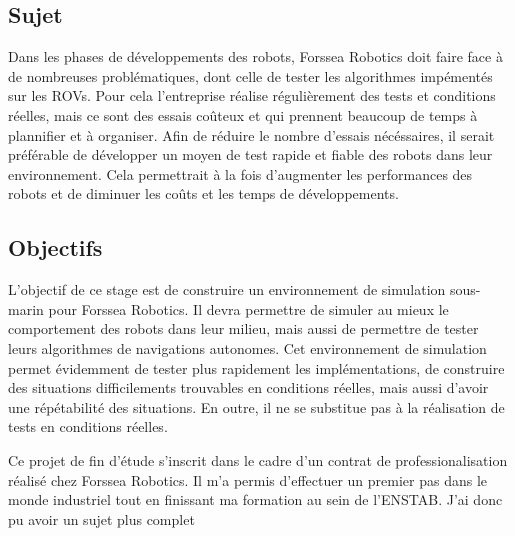 \subsection{Sujet}
    Dans les phases de développements des robots, Forssea Robotics doit faire face à de nombreuses problématiques, dont celle de tester les algorithmes impémentés sur les \gls{ROV}s. Pour cela l'entreprise réalise régulièrement des tests et conditions réelles, mais ce sont des essais coûteux et qui prennent beaucoup de temps à plannifier et à organiser. Afin de réduire le nombre d'essais nécéssaires, il serait préférable de développer un moyen de test rapide et fiable des robots dans leur environnement. Cela permettrait à la fois d'augmenter les performances des robots et de diminuer les coûts et les temps de développements.

\subsection{Objectifs}
    L'objectif de ce stage est de construire un environnement de simulation sous-marin pour Forssea Robotics. Il devra permettre de simuler au mieux le comportement des robots dans leur milieu, mais aussi de permettre de tester leurs algorithmes de navigations autonomes. Cet environnement de simulation permet évidemment de tester plus rapidement les implémentations, de construire des situations difficilements trouvables en conditions réelles, mais aussi d'avoir une répétabilité des situations. En outre, il ne se substitue pas à la réalisation de tests en conditions réelles.

    Ce projet de fin d'étude s'inscrit dans le cadre d'un contrat de professionalisation réalisé chez Forssea Robotics. Il m'a permis d'effectuer un premier pas dans le monde industriel tout en finissant ma formation au sein de l'\gls{ENSTAB}. J'ai donc pu avoir un sujet plus complet